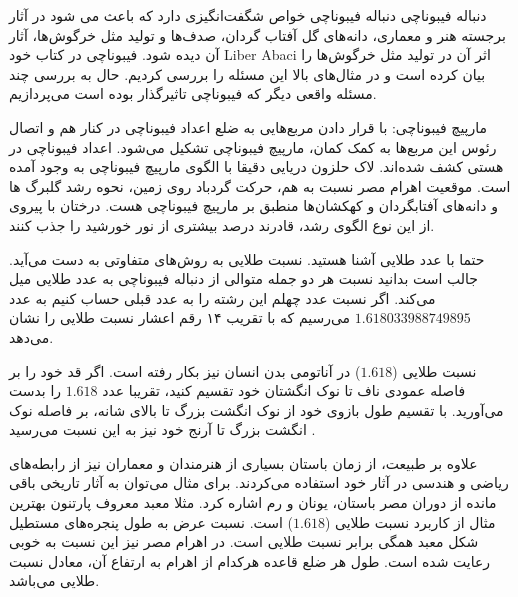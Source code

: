 \begin{EXTRA}{دنباله فیبوناچی}
  \p
دنباله فیبوناچی خواص شگفت‌انگیزی دارد که باعث می شود در آثار برجسته هنر و معماری، دانه‌های گل آفتاب گردان، صدف‌ها و تولید مثل خرگوش‌ها، آثار آن دیده شود.
فیبوناچی در کتاب خود Liber
Abaci
 اثر آن در تولید مثل خرگوش‌ها را بیان کرده است و در مثال‌های بالا این مسئله را بررسی کردیم. حال به بررسی چند مسئله واقعی دیگر که فیبوناچی تاثیرگذار بوده است می‌پردازیم.

مارپیچ فیبوناچی:
با قرار دادن مربع‌هایی به ضلع اعداد فیبوناچی در کنار هم و اتصال رئوس این مربع‌ها به کمک کمان، مارپیچ فیبوناچی تشکیل می‌شود.
\p
{}
اعداد فیبوناچی در هستی کشف شده‌اند.
لاک حلزون
 دریایی دقیقا با الگوی مارپیچ فیبوناچی به وجود آمده است. موقعیت اهرام مصر نسبت به هم، حرکت گردباد روی زمین، نحوه رشد گلبرگ ها و دانه‌های آفتابگردان و کهکشان‌ها منطبق بر مارپیچ فیبوناچی هست.
 درختان با پیروی از این نوع الگوی رشد، قادرند درصد بیشتری از نور خورشید را جذب کنند.

حتما با عدد طلایی آشنا هستید. نسبت طلایی به روش‌های متفاوتی به دست می‌آید. جالب است بدانید نسبت هر دو جمله متوالی از دنباله فیبوناچی به عدد طلایی میل می‌کند.
اگر نسبت عدد چهلم این رشته را به عدد قبلی حساب کنیم به عدد $ 1.618033988749895$ می‌رسیم که با تقریب ۱۴ رقم اعشار نسبت طلایی را نشان می‌دهد.

نسبت طلایی ($1.618$) در آناتومی بدن انسان نیز بکار رفته است. اگر قد خود را بر فاصله عمودی ناف تا نوک انگشتان خود تقسیم کنید، تقریبا عدد $1.618$ را بدست می‌آورید. با تقسیم طول بازوی خود از نوک انگشت بزرگ تا بالای شانه، بر فاصله نوک انگشت بزرگ تا آرنج خود نیز به این نسبت می‌رسید .

 

علاوه بر طبیعت، از زمان باستان بسیاری از هنرمندان و معماران نیز از رابطه‌های ریاضی و هندسی در آثار خود استفاده می‌کردند. برای مثال می‌توان به آثار تاریخی باقی مانده از دوران مصر باستان، یونان و رم اشاره کرد. مثلا معبد معروف پارتنون بهترین مثال از کاربرد نسبت طلایی ($1.618$) است. نسبت عرض به طول پنجره‌های مستطیل شکل معبد همگی برابر نسبت طلایی است. در اهرام مصر نیز این نسبت به خوبی رعایت شده است. طول هر ضلع قاعده هرکدام از اهرام به ارتفاع آن، معادل نسبت طلایی می‌باشد.

\end{EXTRA}